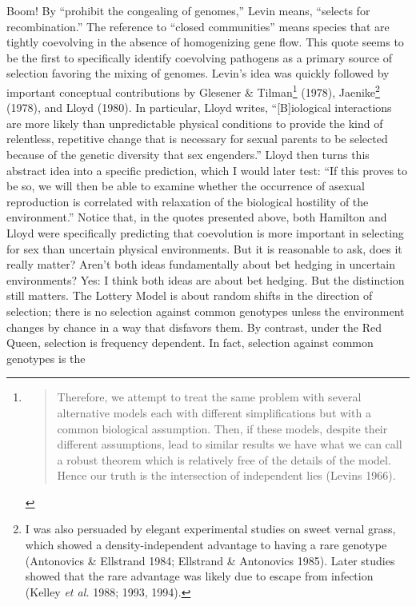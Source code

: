 \documentclass[
  letterpaper,
]{book}
\begin{document}
Boom! By ``prohibit the congealing of genomes,'' Levin means, ``selects
for recombination.'' The reference to ``closed communities'' means
species that are tightly coevolving in the absence of homogenizing gene
flow. This quote seems to be the first to specifically identify
coevolving pathogens as a primary source of selection favoring the
mixing of genomes. Levin's idea was quickly followed by important
conceptual contributions by Glesener \& Tilman\footnote{\begin{quote}
  Therefore, we attempt to treat the same problem with several
  alternative models each with different simplifications but with a
  common biological assumption. Then, if these models, despite their
  different assumptions, lead to similar results we have what we can
  call a robust theorem which is relatively free of the details of the
  model. Hence our truth is the intersection of independent lies (Levins
  1966).
  \end{quote}} (1978), Jaenike\footnote{I was also persuaded by elegant
  experimental studies on sweet vernal grass, which showed a
  density-independent advantage to having a rare genotype (Antonovics \&
  Ellstrand 1984; Ellstrand \& Antonovics 1985). Later studies showed
  that the rare advantage was likely due to escape from infection
  (Kelley \emph{et al.} 1988; 1993, 1994).} (1978), and Lloyd (1980). In
particular, Lloyd writes, ``{[}B{]}iological interactions are more
likely than unpredictable physical conditions to provide the kind of
relentless, repetitive change that is necessary for sexual parents to be
selected because of the genetic diversity that sex engenders.'' Lloyd
then turns this abstract idea into a specific prediction, which I would
later test: ``If this proves to be so, we will then be able to examine
whether the occurrence of asexual reproduction is correlated with
relaxation of the biological hostility of the environment.'' Notice
that, in the quotes presented above, both Hamilton and Lloyd were
specifically predicting that coevolution is more important in selecting
for sex than uncertain physical environments. But it is reasonable to
ask, does it really matter? Aren't both ideas fundamentally about bet
hedging in uncertain environments? Yes: I think both ideas are about bet
hedging. But the distinction still matters. The Lottery Model is about
random shifts in the direction of selection; there is no selection
against common genotypes unless the environment changes by chance in a
way that disfavors them. By contrast, under the Red Queen, selection is
frequency dependent. In fact, selection against common genotypes is the
\end{document}
